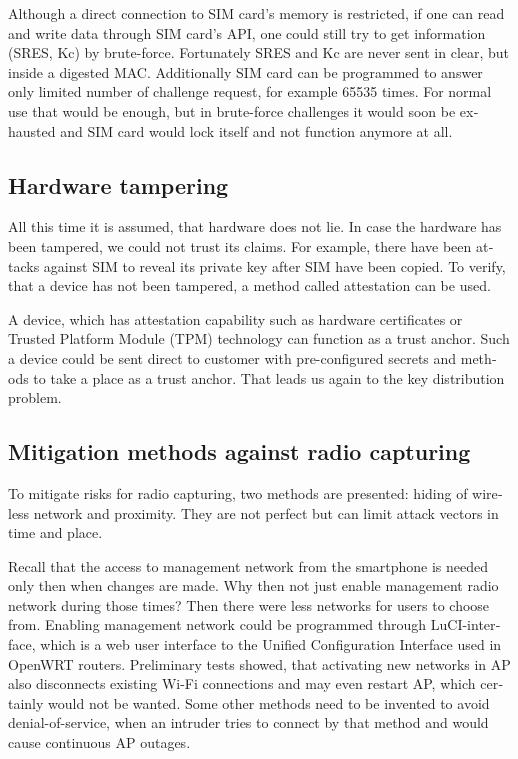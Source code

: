 \documentclass[12pt,a4paper,english]{tutthesis}
\begin{document}
\begin{otherlanguage}{english}
Although a direct connection to SIM card's memory is restricted,
if one can read and write data through SIM card's API,
one could still try to get information (SRES, Kc) by brute-force. 
Fortunately SRES and Kc are never sent in clear, but inside
a digested MAC.
 Additionally SIM card can be programmed to answer only
limited number of challenge request, for example 65535 times.
For normal use that would be enough, but in brute-force challenges 
it would soon be exhausted and SIM card would lock itself and not
function anymore at all.


\subsection{Hardware tampering}
\label{sec-6-1-6}
All this time it is assumed, that hardware does not lie. In case
the hardware has been tampered, we could not trust its claims.
For example, there have been attacks against SIM to reveal its private
key after SIM have been copied.  To verify, that a device has not been
tampered, a method called attestation can be used.

A device, which has attestation capability such as 
hardware certificates or Trusted Platform Module (TPM) technology
can function as a trust anchor.
Such a device could be sent direct to customer with pre-configured
secrets and methods to take a place as a trust anchor. 
That leads us again to the key distribution problem.


\subsection{Mitigation methods against radio capturing}
\label{sec-6-1-7}
To mitigate risks for radio capturing, two methods are presented: hiding of
wireless network and proximity. They are not perfect but can
limit attack vectors in time and place.


Recall that the access to management network from the smartphone is
 needed only then when changes
are made. Why then not just enable management radio network
during those times? Then there were less networks for users to choose from.
Enabling management network could be programmed through 
LuCI-interface, which is a web user interface to the Unified
 Configuration Interface used in OpenWRT routers.
Preliminary tests showed, that activating new networks in AP also 
disconnects existing Wi-Fi connections and may even restart AP,
which certainly would not be wanted. Some other methods need to
be invented to avoid denial-of-service, when an intruder tries to 
connect by that method and would cause continuous AP outages.


\end{otherlanguage}
\end{document}
